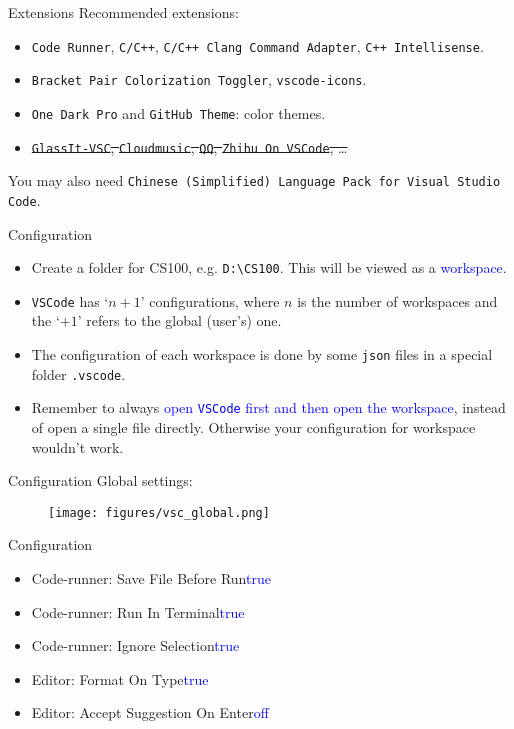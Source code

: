\documentclass{beamer}
\newcommand{\blue}[1]{\textcolor{blue}{#1}}
\begin{document}
\begin{frame}{Extensions}
    Recommended extensions:
    \begin{itemize}
        \item \texttt{Code Runner}, \texttt{C/C++}, \texttt{C/C++ Clang Command Adapter}, \texttt{C++ Intellisense}.
        \item \texttt{Bracket Pair Colorization Toggler}, \texttt{vscode-icons}.
        \item \texttt{One Dark Pro} and \texttt{GitHub Theme}: color themes.
        \item \sout{\texttt{GlassIt-VSC}, \texttt{Cloudmusic}, \texttt{QQ}, \texttt{Zhihu On VSCode}, \dots}
    \end{itemize}
    You may also need \texttt{Chinese (Simplified) Language Pack for Visual Studio Code}.
\end{frame}

\begin{frame}{Configuration}
    \begin{itemize}
        \item Create a folder for CS100, e.g. \texttt{D:\textbackslash CS100}. This will be viewed as a \blue{workspace}.
        \pause
        \item \texttt{VSCode} has `\(n+1\)' configurations, where \(n\) is the number of workspaces and the `\(+1\)' refers to the global (user's) one.
        \item The configuration of each workspace is done by some \texttt{json} files in a special folder \texttt{.vscode}.
        \pause
        \item Remember to always \blue{open \texttt{VSCode} first and then open the workspace}, instead of open a single file directly. Otherwise your configuration for workspace wouldn't work.
    \end{itemize}
\end{frame}

\begin{frame}{Configuration}
    Global settings:
    \begin{figure}[h]
        \centering
        \texttt{[image: figures/vsc\_global.png]}
    \end{figure}
\end{frame}

\begin{frame}{Configuration}
    \begin{itemize}
        \item Code-runner: Save File Before Run\quad\blue{true}
        \item Code-runner: Run In Terminal\quad\blue{true}
        \item Code-runner: Ignore Selection\quad\blue{true}
        \item Editor: Format On Type\quad\blue{true}
        \item Editor: Accept Suggestion On Enter\quad\blue{off}
    \end{itemize}
\end{frame}
\end{document}

